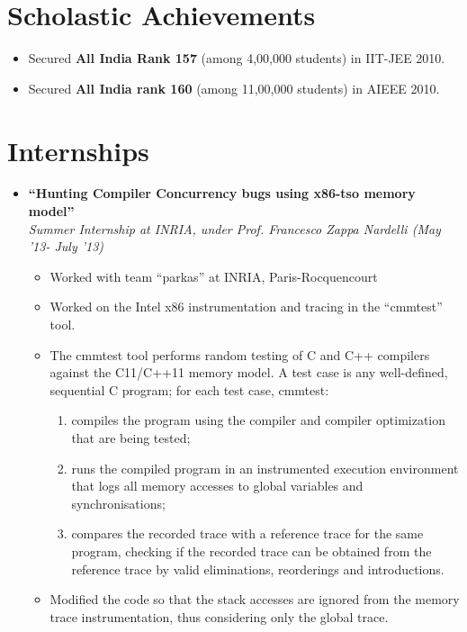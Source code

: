 \documentclass[margin,line]{resume}
\begin{document}
\begin{resume}
  \section{\mysidestyle Scholastic Achievements}
  \begin{itemize}
  \item Secured \textbf{\textsf{All India Rank 157}} (among 4,00,000 students) in IIT-JEE 2010.
  \item Secured \textbf{\textsf{All India rank 160}} (among 11,00,000 students) in AIEEE 2010.
  \end{itemize}

  \section{\mysidestyle Internships}
  \begin{itemize}
  \item \large{\textbf{\textsf{``Hunting Compiler Concurrency bugs using x86-tso memory model''}}}
    \\ \small{\textit{Summer Internship at INRIA, under Prof. Francesco Zappa Nardelli (May '13- July '13)}}
    \normalsize
    \begin{itemize}
    \item Worked with team ``parkas'' at INRIA, Paris-Rocquencourt
    \item Worked on the Intel x86 instrumentation and tracing in the ``cmmtest'' tool. 
    \item The cmmtest tool performs random testing of C and C++ compilers against the C11/C++11 memory model. A test case is any well-defined, sequential C program; for each test case, cmmtest:
      \begin{enumerate}
      \item compiles the program using the compiler and compiler optimization that are being tested;
      \item runs the compiled program in an instrumented execution environment that logs all memory accesses to global variables and synchronisations;
      \item compares the recorded trace with a reference trace for the same program, checking if the recorded trace can be obtained from the reference trace by valid eliminations, reorderings and introductions.
      \end{enumerate}
      \item Modified the code so that the stack accesses are ignored from the memory trace instrumentation, thus considering only the global trace.

\end{itemize}
\end{itemize}
\end{resume}
\end{document}
